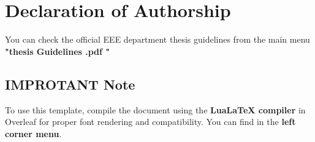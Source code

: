 \chapter*{Declaration of Authorship}
\vspace{2em}


You can check the official EEE department thesis guidelines from the main menu \textbf{"thesis Guidelines .pdf "}

\section*{IMPROTANT Note}

To use this template, compile the document using the \textbf{LuaLaTeX compiler} in Overleaf for proper font rendering and compatibility. You can find in the \textbf{left corner menu}.